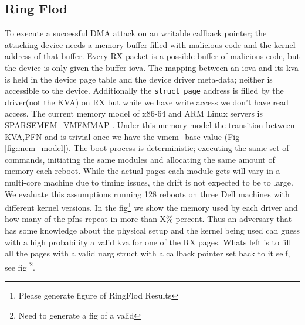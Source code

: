 \subsection{Ring Flod}
To execute a successful DMA attack on an writable callback pointer; the attacking device needs a memory buffer filled with malicious code and the kernel address of that buffer.
Every RX packet is a possible buffer of malicious code, but the device is only given the buffer iova. The mapping between an iova and its kva is held in the device page table and the device driver meta-data; neither is accessible to the device. Additionally the \texttt{struct page} address is filled by the driver(not the KVA) on RX but while we have write access we don't have read access. The current memory model of x86-64 and ARM Linux servers is SPARSEMEM\_VMEMMAP \cite{mem_model}. Under this memory model the transition between KVA,PFN and \page is trivial once we have the vmem\_base value (Fig \ref{fig:mem_model}).\newline 
The boot process is deterministic; executing the same set of commands, initiating the same modules and allocating the same amount of memory each reboot. While the actual pages each module gets will vary in a multi-core machine due to timing issues, the drift is not expected to be to large. We evaluate this assumptions running 128 reboots on three Dell machines with different kernel versions. In the fig\footnote{Please generate figure of RingFlod Results} we show the memory used by each driver and how many of the pfns repeat in more than X\% percent. Thus an adversary that has some knowledge about the physical setup and the kernel being used can guess with a high probability a valid kva for one of the RX pages. Whats left is to fill all the pages with a valid uarg struct with a callback pointer set back to it self, see fig \footnote{Need to generate a fig of a valid \uarg}.

